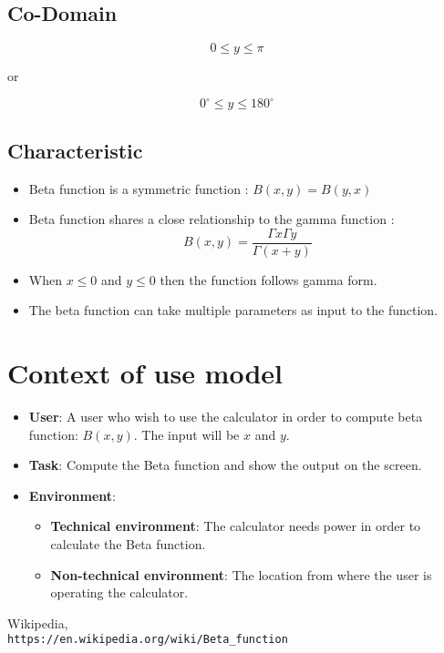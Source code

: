 \documentclass[12pt]{report}
\begin{document}
\subsection{Co-Domain}  
$$0 \leq y \leq \pi  $$ 
\begin{center}
 or   
\end{center}
$$0^\circ\leq y \leq 180^\circ $$

\subsection{Characteristic}
\begin{itemize}
    \item Beta function is a symmetric function : $ B(x,y) = B(y,x) $
    \item Beta function shares a close relationship to the gamma function :  $$ B(x,y)=\frac{\Gamma x \Gamma y}{\Gamma (x+y)}$$
    \item When $ x \leq 0 $ and $ y \leq 0 $ then the function follows gamma form.
    \item The beta function can take multiple parameters as input to the function.
\end{itemize}


\newpage
\section{Context of use model}
\begin{itemize}
    \item 
    \textbf{User}: A user who wish to use the calculator in order to compute beta function: $B(x,y)$. The input will be $x$ and $y$.
    \item
    \textbf{Task}: Compute the Beta function and show the output on the screen.
    \item
    \textbf{Environment}:
    \begin{itemize}
    \item \textbf{Technical environment}:
    The calculator needs power in order to calculate the Beta function.
    \item \textbf{Non-technical environment}:
    The location from where the user is operating the calculator.
    \end{itemize}
\end{itemize}

\begin{thebibliography}{4}
Wikipedia,
\\\texttt{https://en.wikipedia.org/wiki/Beta\_function}

\end{thebibliography}
\end{document}
